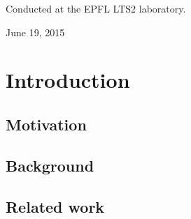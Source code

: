 \documentclass[a4paper,12pt,twoside]{report}
\begin{document}
\begin{titlepage}
\begin{center}
	\end{center}
	
	\vspace{1.3cm}
	{\large Conducted at the EPFL LTS2 laboratory.}
	\vspace{1.3cm}

	\begin{center}
		{\large June 19, 2015}
	\end{center}
	
\end{titlepage}
\hypersetup{pageanchor=true}

\begin{abstract}
	abstract
\end{abstract}

\renewcommand{\abstractname}{Acknowledgements}
\begin{abstract}
	Xavier for day-to-day supervision. Many inputs and intuitions. Discussion of the results.
	
	Johan for intuitions at the start of the project, advices and proof reading of the thesis.
	
	Pierre
	
\end{abstract}

\tableofcontents

\chapter*{Introduction}

\section*{Motivation}

\section*{Background}
\label{background}

\section*{Related work}
\end{document}
